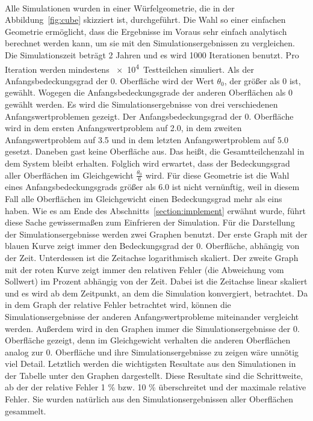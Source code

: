 \documentclass{listhesis}
\begin{document}
\paragraph{}
Alle Simulationen wurden in einer Würfelgeometrie, die in der Abbildung~\ref{fig:cube} skizziert ist, durchgeführt. Die Wahl so einer einfachen Geometrie ermöglicht, dass die Ergebnisse im Voraus sehr einfach analytisch berechnet werden kann, um sie mit den Simulationsergebnissen zu vergleichen. Die Simulationszeit beträgt 2 Jahren und es wird 1000 Iterationen benutzt. Pro Iteration werden mindestens \SI{e4}{Testteilchen} simuliert. Als der Anfangsbedeckungsgrad der 0. Oberfläche wird der Wert $\theta_0$, der größer als 0 ist, gewählt. Wogegen die Anfangsbedeckungsgrade der anderen Oberflächen als 0 gewählt werden. Es wird die Simulationsergebnisse von drei verschiedenen Anfangswertproblemen gezeigt. Der Anfangsbedeckungsgrad der 0. Oberfläche wird in dem ersten Anfangswertproblem auf 2.0, in dem zweiten Anfangswertproblem auf 3.5 und in dem letzten Anfangswertproblem auf 5.0 gesetzt. Daneben gast keine Oberfläche aus. Das heißt, die Gesamtteilchenzahl in dem System bleibt erhalten. Folglich wird erwartet, dass der Bedeckungsgrad aller Oberflächen im Gleichgewicht $\frac{\theta_0}{6}$ wird. Für diese Geometrie ist die Wahl eines Anfangsbedeckungsgrads größer als 6.0 ist nicht vernünftig, weil in diesem Fall alle Oberflächen im Gleichgewicht einen Bedeckungsgrad mehr als eins haben. Wie es am Ende des Abschnitts~\ref{section:implement} erwähnt wurde, führt diese Sache gewissermaßen zum Einfrieren der Simulation. Für die Darstellung der Simulationsergebnisse werden zwei Graphen benutzt. Der erste Graph mit der blauen Kurve zeigt immer den Bedeckungsgrad der 0. Oberfläche, abhängig von der Zeit. Unterdessen ist die Zeitachse logarithmisch skaliert. Der zweite Graph mit der roten Kurve zeigt immer den relativen Fehler (die Abweichung vom Sollwert) im Prozent abhängig von der Zeit. Dabei ist die Zeitachse linear skaliert und es wird ab dem Zeitpunkt, an dem die Simulation konvergiert, betrachtet. Da in dem Graph der relative Fehler betrachtet wird, können die Simulationsergebnisse der anderen Anfangswertprobleme miteinander vergleicht werden. Außerdem wird in den Graphen immer die Simulationsergebnisse der 0. Oberfläche gezeigt, denn im Gleichgewicht verhalten die anderen Oberflächen analog zur 0. Oberfläche und ihre Simulationsergebnisse zu zeigen wäre unnötig viel Detail. Letztlich werden die wichtigsten Resultate aus den Simulationen in der Tabelle unter den Graphen dargestellt. Diese Resultate sind die Schrittweite, ab der der relative Fehler 1 \% bzw. 10 \% überschreitet und der maximale relative Fehler. Sie wurden natürlich aus den Simulationsergebnissen aller Oberflächen gesammelt.
\end{document}
